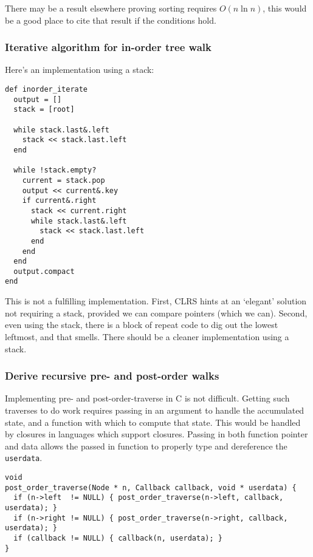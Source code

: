 \documentclass{article}
\begin{document}
There may be a result elsewhere proving sorting requires $O(n\ln n)$,
this would be a good place to cite that result if the conditions hold.

\subsubsection{Iterative algorithm for in-order tree walk}

Here's an implementation using a stack:

\begin{lstlisting}[frame=single,title=Iterative inorder traverse]
def inorder_iterate
  output = []
  stack = [root]

  while stack.last&.left
    stack << stack.last.left
  end

  while !stack.empty?
    current = stack.pop
    output << current&.key
    if current&.right
      stack << current.right
      while stack.last&.left
        stack << stack.last.left
      end
    end
  end
  output.compact
end
\end{lstlisting}

This is not a fulfilling implementation. First, CLRS hints at an
`elegant' solution not requiring a stack, provided we can compare pointers
(which we can). Second, even using the stack, there is a block of
repeat code to dig out the lowest leftmost, and that smells. There should
be a cleaner implementation using a stack.


\subsubsection{Derive recursive pre- and post-order walks}

Implementing pre- and post-order-traverse in C is not difficult. Getting
such traverses to do work requires passing in an argument to handle
the accumulated state, and a function with which to compute that state.
This would be handled by closures in languages which support closures.
Passing in both function pointer and data allows the passed in function
to properly type and dereference the \texttt{userdata}.

\begin{lstlisting}[frame=single,title=Post-order traverse]
void
post_order_traverse(Node * n, Callback callback, void * userdata) {
  if (n->left  != NULL) { post_order_traverse(n->left, callback, userdata); }
  if (n->right != NULL) { post_order_traverse(n->right, callback, userdata); }
  if (callback != NULL) { callback(n, userdata); }
}
\end{lstlisting}
\end{document}
